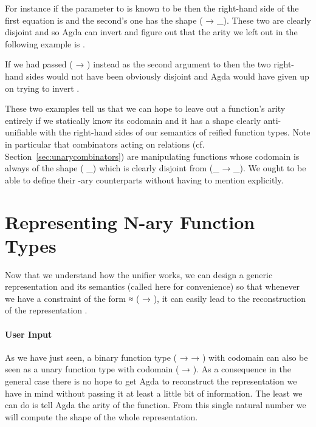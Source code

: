 For instance if the  parameter to  is known to be
 then the right-hand side of the first equation is  and
the second's one has the shape {( → \_)}. These two are clearly
disjoint and so Agda can invert  and figure out that the
arity we left out in the following example is .


If we had passed {( → )} instead as the second argument to
 then the two right-hand sides would not have been obviously
disjoint and Agda would have given up on trying to invert .


These two examples tell us that we can hope to leave out a function's
arity entirely if we statically know its codomain and it has a shape
clearly anti-unifiable with the right-hand sides of our semantics of
reified function types. Note in particular that combinators acting
on relations (cf. Section~\ref{sec:unarycombinators}) are manipulating
functions whose codomain is always of the shape {( \_)} which
is clearly disjoint from {(\_ → \_)}. We ought to be able to define
their -ary counterparts without having to mention  explicitly.

\section{Representing N-ary Function Types}\label{sec:naryfunction}

Now that we understand how the unifier works, we can design a generic
representation and its semantics (called  here for convenience)
so that whenever we have a constraint of the form
{   ≈ ( → )}, it can easily
lead to the reconstruction of the representation .

\paragraph{User Input} As we have just seen, a binary function type
{( →  → )} with codomain  can also be seen as
a unary function type with codomain {( → )}. As a consequence
in the general case there is no hope to get Agda to reconstruct the
representation we have in mind without passing it at least a little bit
of information. The least we can do is tell Agda the arity of the function.
From this single natural number we will compute the shape of the whole
representation.

